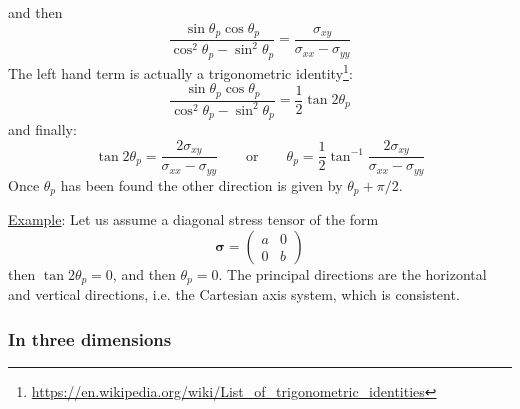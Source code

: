 and then 
\[
\frac{ \sin\theta_p \cos\theta_p}{ \cos^2\theta_p -\sin^2\theta_p }
= \frac{\sigma_{xy}}{ \sigma_{xx}-\sigma_{yy} }
\]
The left hand term is actually a trigonometric 
identity\footnote{\url{https://en.wikipedia.org/wiki/List_of_trigonometric_identities}}:
\[
\frac{ \sin\theta_p \cos\theta_p}{ \cos^2\theta_p -\sin^2\theta_p } = \frac{1}{2} \tan 2\theta_p
\]
and finally:
\[
\tan 2\theta_p = \frac{ 2\sigma_{xy}}{ \sigma_{xx}-\sigma_{yy} }
\qquad
\text{or}
\qquad
\theta_p = \frac{1}{2} \tan^{-1} \frac{ 2\sigma_{xy}}{ \sigma_{xx}-\sigma_{yy} }
\]
Once $\theta_p$ has been found the other direction is given by $\theta_p +\pi/2$.

\vspace{.5cm}

\noindent \underline{Example}: Let us assume a diagonal stress tensor of the form 
\[
{\bm \sigma} = 
\left(
\begin{array}{cc}
a & 0 \\
0 & b
\end{array}
\right)
\]
then $\tan 2\theta_p = 0$, and then $\theta_p=0$. The principal directions are the horizontal and 
vertical directions, i.e. the Cartesian axis system, which is consistent.

\subsubsection{In three dimensions}

